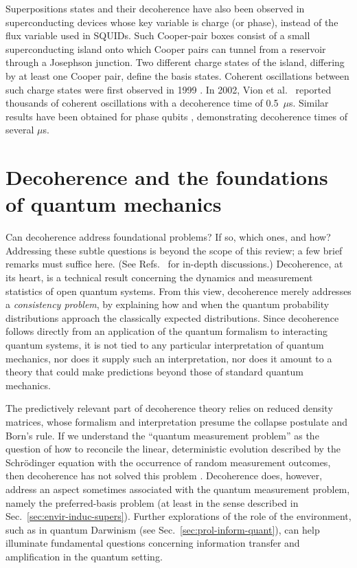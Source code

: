 \documentclass[aps,pra,reprint,amsmath,amssymb,showpacs,nofootinbib,floatfix,onecolumn,12pt]{revtex4-1}
\begin{document}
Superpositions states and their decoherence have also been observed in superconducting devices whose key variable is charge (or phase), instead of the flux variable used in SQUIDs. Such Cooper-pair boxes consist of a small superconducting island onto which Cooper pairs can tunnel from a reservoir through a Josephson junction. Two different charge states of the island, differing by at least one Cooper pair, define the basis states. Coherent oscillations between such charge states were first observed in 1999 \cite{Nakamura:1999:ub}. In 2002, Vion et al.\ \cite{Vion:2002:oo} reported thousands of coherent oscillations with a decoherence time of 0.5~$\mu$s. Similar results have been obtained for phase qubits \cite{Yu:2002:yb,Martinis:2002:qq}, demonstrating decoherence times of several $\mu$s. 


\section{\label{sec:impl-found-quant}Decoherence and the foundations of quantum mechanics}

Can decoherence address foundational problems? If so, which ones, and how? Addressing these subtle questions is beyond the scope of this review; a few brief remarks must suffice here. (See Refs.~\cite{Bacciagaluppi:2003:yz,Schlosshauer:2003:tv,Schlosshauer:2006:rw,Schlosshauer:2007:un} for in-depth discussions.)  Decoherence, at its heart, is a technical result concerning the dynamics and measurement statistics of open quantum systems. From this view, decoherence merely addresses a \emph{consistency problem}, by explaining how and when the quantum probability distributions approach the classically expected distributions. Since decoherence follows directly from an application of the quantum formalism to interacting quantum systems, it is not tied to any particular interpretation of quantum mechanics, nor does it supply such an interpretation, nor does it amount to a theory that could make predictions beyond those of standard quantum mechanics. 

The predictively relevant part of decoherence theory relies on reduced density matrices, whose formalism and interpretation presume the collapse postulate and Born's rule. If we understand the ``quantum measurement problem'' as the question of how to reconcile the linear, deterministic evolution described by the Schr\"odinger equation with the occurrence of random measurement outcomes, then decoherence has not solved this problem \cite{Schlosshauer:2003:tv,Schlosshauer:2007:un}. Decoherence does, however, address an aspect sometimes associated with the quantum measurement problem, namely the preferred-basis problem (at least in the sense described in Sec.~\ref{sec:envir-induc-supers}). Further explorations of the role of the environment, such as in quantum Darwinism (see Sec.~\ref{sec:prol-inform-quant}), can help illuminate fundamental questions concerning information transfer and amplification in the quantum setting.
\end{document}

